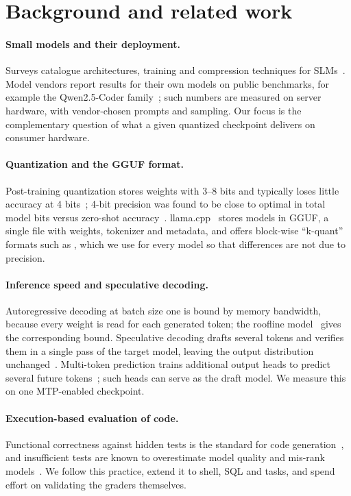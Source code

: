 \section{Background and related work}
\paragraph{Small models and their deployment.} Surveys catalogue architectures, training and compression techniques for SLMs~\citep{nguyen2024slmsurvey}. Model vendors report
results for their own models on public benchmarks, for example the Qwen2.5-Coder family~\citep{hui2024qwen25coder}; such numbers are measured on server hardware, with
vendor-chosen prompts and sampling. Our focus is the complementary question of what a given quantized checkpoint delivers on consumer hardware.

\paragraph{Quantization and the GGUF format.} Post-training quantization stores weights with 3--8 bits and typically loses little accuracy at 4 bits~\citep{frantar2023gptq,dettmers2023case}; 4-bit precision was found to be close to optimal in total model bits versus zero-shot accuracy~\citep{dettmers2023case}.
llama.cpp~\citep{llamacpp} stores models in GGUF, a single file with weights, tokenizer and metadata, and offers block-wise ``k-quant'' formats such as , which we use for every model so that
differences are not due to precision.

\paragraph{Inference speed and speculative decoding.} Autoregressive decoding at batch size one is bound by memory bandwidth, because every weight is read for each generated token; the
roofline model~\citep{williams2009roofline} gives the corresponding bound. Speculative decoding drafts several tokens and verifies them in a single pass of the target model, leaving the output distribution
unchanged~\citep{leviathan2023speculative}. Multi-token prediction trains additional output heads to predict several future tokens~\citep{gloeckle2024mtp}; such heads can serve as the draft model.
We measure this on one MTP-enabled checkpoint.

\paragraph{Execution-based evaluation of code.} Functional correctness against hidden tests is the standard for code generation~\citep{chen2021codex}, and insufficient tests are known to
overestimate model quality and mis-rank models~\citep{liu2023evalplus}. We follow this practice, extend it to shell, SQL and  tasks, and spend effort on validating the graders themselves.

